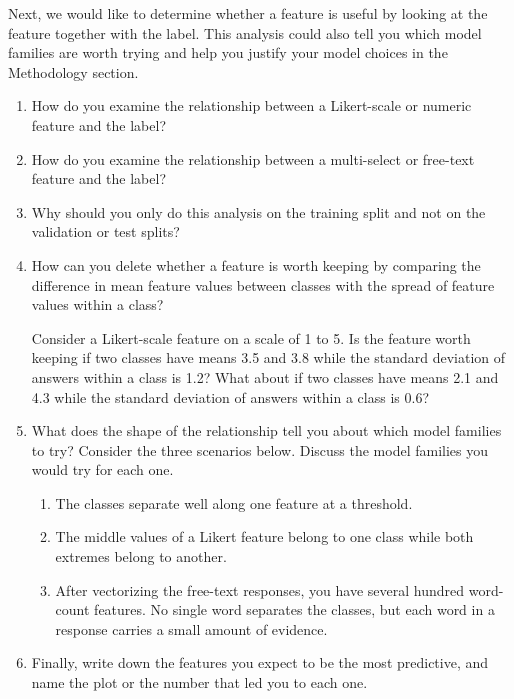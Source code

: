 \documentclass[12pt]{article}
\begin{document}
\begin{enumerate}
\smallskip
Next, we would like to determine whether a feature is useful by looking at the feature together with the label. This analysis could also tell you which model families are worth trying and help you justify your model choices in the Methodology section.
\smallskip

\begin{enumerate}

\item How do you examine the relationship between a Likert-scale or numeric feature and the label?

\item How do you examine the relationship between a multi-select or free-text feature and the label?

\item Why should you only do this analysis on the training split and not on the validation or test splits?

\item How can you delete whether a feature is worth keeping by comparing the difference in mean feature values between classes with the spread of feature values within a class?

\smallskip
Consider a Likert-scale feature on a scale of 1 to 5. Is the feature worth keeping if two classes have means 3.5 and 3.8 while the standard deviation of answers within a class is 1.2? What about if two classes have means 2.1 and 4.3 while the standard deviation of answers within a class is 0.6?

\item What does the shape of the relationship tell you about which model families to try? Consider the three scenarios below. Discuss the model families you would try for each one.
\begin{enumerate}
\item The classes separate well along one feature at a threshold.
\item The middle values of a Likert feature belong to one class while both extremes belong to another.
\item After vectorizing the free-text responses, you have several hundred word-count features. No single word separates the classes, but each word in a response carries a small amount of evidence.
\end{enumerate}

\item Finally, write down the features you expect to be the most predictive, and name the plot or the number that led you to each one.

\end{enumerate}

\end{enumerate}
\end{document}
